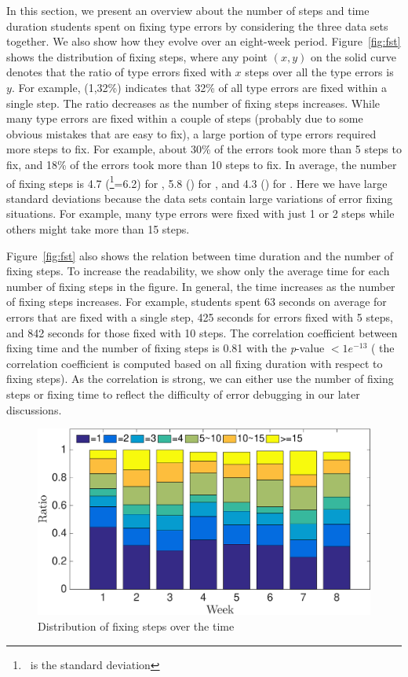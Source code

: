 \documentclass[12pt]{report}	%
\begin{document}
In this section, we present an overview about the number
of steps and time duration students spent on fixing
type errors by considering the three data sets
together. We also show how they evolve over an eight-week
period. 
%
Figure~\ref{fig:fst} shows the distribution of 
fixing steps, where any point $(x,y)$ on the 
solid curve denotes that the ratio of type errors
fixed with $x$ steps over all the type errors is
$y$. 
%
%
For example, (1,32\%) indicates that 32\% of all type
errors are fixed within a single step. 
%
The ratio decreases as the number of fixing steps increases.
%
While many type errors are fixed within a couple of 
steps (probably due to some obvious mistakes that are easy
to fix), 
a large portion of type errors required
more steps to fix.
For example, about 30\% of the errors took more than 5 steps to fix,
and 18\% of the errors took more than 10 steps to fix.
In average, the number of fixing steps 
is 4.7 (\std \footnote{\std\ is the standard deviation}=6.2)
for \benchf,
5.8 () for \benchs, 
and 4.3 () for \benchl.
Here we have large standard deviations because 
the data sets contain large variations of error fixing
situations. For example, many type errors were fixed with
just 1 or 2 steps while others might take more than 15 steps.


Figure~\ref{fig:fst} also shows the relation 
between time duration and the number of fixing steps.
To increase the readability, we show only the average
time for each number of fixing steps in the figure. 
%
In general, the time increases as the number 
of fixing steps increases. 
For example, students spent 63 seconds on average
for errors that are fixed with a single step,
425 seconds for errors fixed with 5 steps,
and 842 seconds for those fixed with 10 steps. 
%
The correlation coefficient between 
fixing time and the number of fixing steps
is 0.81 with the \emph{p}-value $< 1e^{-13}$ (
the correlation coefficient is computed 
based on all fixing duration with respect to fixing steps).
As the correlation is strong,
we can either use the number of fixing steps
or fixing time to reflect the difficulty of error debugging  in our later discussions.


\begin{figure}
\centering
\includegraphics[width=0.85\columnwidth]{images/step_time_ratio_1.eps}
\caption{Distribution of fixing steps over the time}
\label{fig:sot}
\label{fig:overview:dos}
\end{figure}
\end{document}
